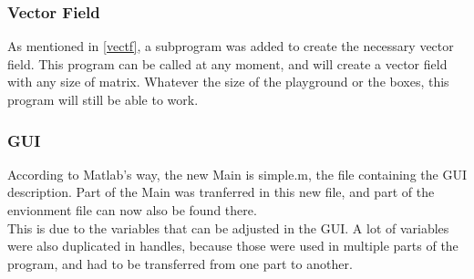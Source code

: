 \subsubsection{Vector Field}

As mentioned in \ref{vectf}, a subprogram was added to create the necessary vector field.
This program can be called at any moment, and will create a vector field with any size of matrix.
Whatever the size of the playground or the boxes, this program will still be able to work.

\subsubsection{GUI}

According to Matlab's way, the new Main is simple.m, the file containing the GUI description.
Part of the Main was tranferred in this new file, and part of the envionment file can now also be found there.\\

This is due to the variables that can be adjusted in the GUI.
A lot of variables were also duplicated in handles, because those were used in multiple parts of the program, and had to be transferred from one part to another.
